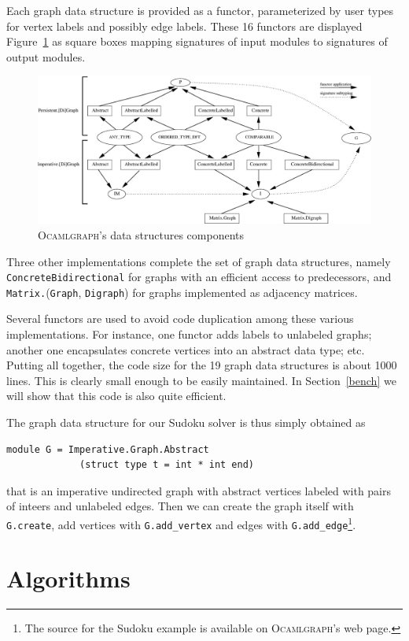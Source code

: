 \documentclass[tfpsymp]{tfp05symp}
\newcommand{\ocamlgraph}{\textsc{Ocamlgraph}\xspace}
\begin{document}
Each graph data structure is provided as a
functor, parameterized by user types for vertex labels and possibly edge
labels. These 16 
functors are displayed Figure~\ref{fig:interfaces} as square boxes
mapping signatures of input modules to signatures of output modules.
\begin{figure}
  \centering
  \includegraphics[width=\textwidth]{interface.eps} 
  \caption{\ocamlgraph's data structures components}\label{fig:interfaces}
\end{figure}
Three other implementations complete the set of graph data structures,
namely \texttt{ConcreteBidirectional} for graphs with an efficient
access to predecessors, and
\texttt{Matrix.}(\texttt{Graph}, \texttt{Digraph}) for graphs
implemented as adjacency matrices.

Several functors are used to avoid code duplication among these
various implementations. For instance, one functor adds labels to
unlabeled graphs; another one encapsulates concrete vertices into an
abstract data type; etc.  Putting all together, the code size for the 19
graph data structures is about 1000 lines. This is clearly small
enough to be easily maintained. In Section~\ref{bench} we will show
that this code is also quite efficient.

The graph data structure for our Sudoku solver is thus simply obtained as
\begin{verbatim}
module G = Imperative.Graph.Abstract
             (struct type t = int * int end) 
\end{verbatim}
that is an imperative undirected graph with abstract vertices labeled
with pairs of inteers and unlabeled edges.
Then we can create the graph itself with \texttt{G.create}, add
vertices with \texttt{G.add\_vertex} and edges with
\texttt{G.add\_edge}\footnote{The source for the Sudoku example is
  available on \ocamlgraph's web page.}.

\section{Algorithms}\label{algos}
\end{document}
